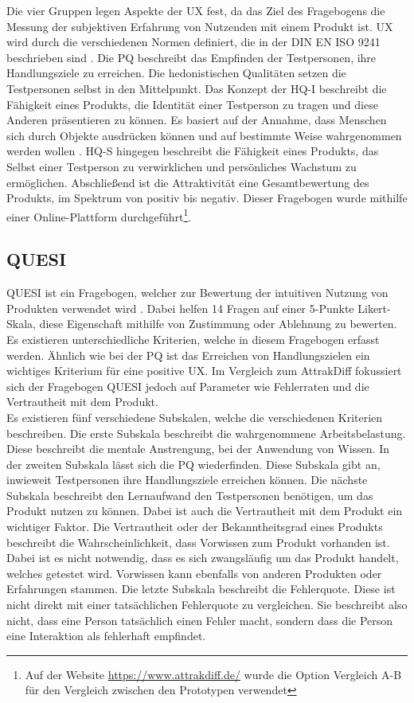 Die vier Gruppen legen Aspekte der \ac{UX} fest, da das Ziel des Fragebogens die Messung der subjektiven Erfahrung von Nutzenden mit einem Produkt ist.
\ac{UX} wird durch die verschiedenen Normen definiert, die in der DIN EN ISO 9241 beschrieben sind \cite{iso9241}.
Die \ac{PQ} beschreibt das Empfinden der Testpersonen, ihre Handlungsziele zu erreichen.
Die hedonistischen Qualitäten setzen die Testpersonen selbst in den Mittelpunkt.
Das Konzept der \ac{HQ-I} beschreibt die Fähigkeit eines Produkts, die Identität einer Testperson zu tragen und diese Anderen präsentieren zu können.
Es basiert auf der Annahme, dass Menschen sich durch Objekte ausdrücken können und auf bestimmte Weise wahrgenommen werden wollen \cite{prentice}.
\ac{HQ-S} hingegen beschreibt die Fähigkeit eines Produkts, das Selbst einer Testperson zu verwirklichen und persönliches Wachstum zu ermöglichen.
Abschließend ist die Attraktivität eine Gesamtbewertung des Produkts, im Spektrum von positiv bis negativ.
Dieser Fragebogen wurde mithilfe einer Online-Plattform durchgeführt\footnote{Auf der Website \url{https://www.attrakdiff.de/} wurde die Option \glqq Vergleich A-B\grqq{} für den Vergleich zwischen den Prototypen verwendet}.

\subsection{QUESI}
\ac{QUESI} ist ein Fragebogen, welcher zur Bewertung der intuitiven Nutzung von Produkten verwendet wird \cite{quesi-benchmarks, quesi-short}.
Dabei helfen 14 Fragen auf einer 5-Punkte Likert-Skala, diese Eigenschaft mithilfe von Zustimmung oder Ablehnung zu bewerten.
Es existieren unterschiedliche Kriterien, welche in diesem Fragebogen erfasst werden.
Ähnlich wie bei der \ac{PQ} ist das Erreichen von Handlungszielen ein wichtiges Kriterium für eine positive \ac{UX}.
Im Vergleich zum AttrakDiff fokussiert sich der Fragebogen \ac{QUESI} jedoch auf Parameter wie Fehlerraten und die Vertrautheit mit dem Produkt.\\

Es existieren fünf verschiedene Subskalen, welche die verschiedenen Kriterien beschreiben.
Die erste Subskala beschreibt die wahrgenommene Arbeitsbelastung.
Diese beschreibt die mentale Anstrengung, bei der Anwendung von Wissen.
In der zweiten Subskala lässt sich die \ac{PQ} wiederfinden.
Diese Subskala gibt an, inwieweit Testpersonen ihre Handlungsziele erreichen können.
Die nächste Subskala beschreibt den Lernaufwand den Testpersonen benötigen, um das Produkt nutzen zu können.
Dabei ist auch die Vertrautheit mit dem Produkt ein wichtiger Faktor.
Die Vertrautheit oder der Bekanntheitsgrad eines Produkts beschreibt die Wahrscheinlichkeit, dass Vorwissen zum Produkt vorhanden ist.
Dabei ist es nicht notwendig, dass es sich zwangsläufig um das Produkt handelt, welches getestet wird.
Vorwissen kann ebenfalls von anderen Produkten oder Erfahrungen stammen.
Die letzte Subskala beschreibt die Fehlerquote.
Diese ist nicht direkt mit einer tatsächlichen Fehlerquote zu vergleichen.
Sie beschreibt also nicht, dass eine Person tatsächlich einen Fehler macht, sondern dass die Person eine Interaktion als fehlerhaft empfindet.

